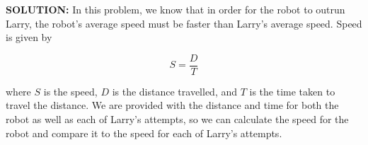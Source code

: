 \textbf{SOLUTION:}
\blank
In this problem, we know that in order for the robot to outrun Larry, the robot's average speed must be faster than Larry's average speed. Speed is given by

$$ S = \frac{D}{T} $$

where $ S $ is the speed, $ D $ is the distance travelled, and $ T $ is the time taken to travel the distance.  We are provided with the distance and time for both the robot as well as each of Larry's attempts, so we can calculate the speed for the robot and compare it to the speed for each of Larry's attempts.